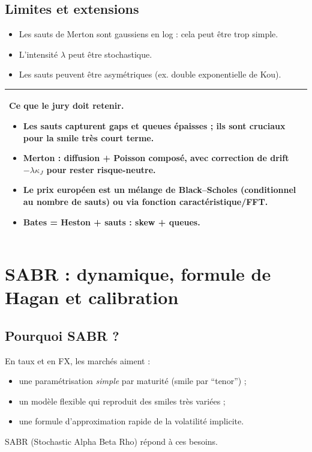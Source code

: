 \documentclass[11pt,a4paper]{report}
\newcommand{\1}{\mathbbm{1}}
\theoremstyle{definition}
\theoremstyle{plain}
\theoremstyle{remark}
\newenvironment{jurybox}{%
  \begin{center}
  \setlength{\tabcolsep}{6pt}%
  \renewcommand{\arraystretch}{1.1}%
  \begin{tabular}{|p{0.94\textwidth}|}
  \hline
  \small\textbf{Ce que le jury doit retenir.}\par\medskip
}{%
  \\ \hline
  \end{tabular}
  \end{center}
}
\begin{document}
\section{Limites et extensions}
\begin{itemize}
  \item Les sauts de Merton sont gaussiens en log : cela peut être trop simple.
  \item L'intensité $\lambda$ peut être stochastique.
  \item Les sauts peuvent être asymétriques (ex. double exponentielle de Kou).
\end{itemize}

\begin{jurybox}
\begin{itemize}
\item Les sauts capturent gaps et queues épaisses ; ils sont cruciaux pour la smile très court terme.
\item Merton : diffusion + Poisson composé, avec correction de drift $-\lambda\kappa_J$ pour rester risque-neutre.
\item Le prix européen est un mélange de Black--Scholes (conditionnel au nombre de sauts) ou via fonction caractéristique/FFT.
\item Bates = Heston + sauts : skew + queues.
\end{itemize}
\end{jurybox}

\chapter{SABR : dynamique, formule de Hagan et calibration}
\label{chap:sabr}

\section{Pourquoi SABR ?}
En taux et en FX, les marchés aiment :
\begin{itemize}
  \item une paramétrisation \emph{simple} par maturité (smile par ``tenor'') ;
  \item un modèle flexible qui reproduit des smiles très variées ;
  \item une formule d'approximation rapide de la volatilité implicite.
\end{itemize}
SABR (Stochastic Alpha Beta Rho) répond à ces besoins.
\end{document}
